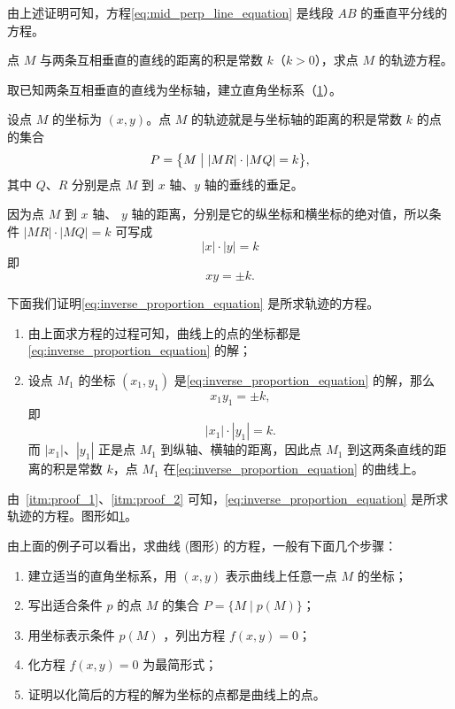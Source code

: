 由上述证明可知，方程\cref{eq:mid_perp_line_equation} 是线段 $AB$ 的垂直平分线的方程。
\begin{example}
  点 $M$ 与两条互相垂直的直线的距离的积是常数 $k$（$k>0$），求点 $M$ 的轨迹方程。
\end{example}
\begin{figure}
  \caption{}\label{fig:2-3}
\end{figure}
\begin{solution}
  取已知两条互相垂直的直线为坐标轴，建立直角坐标系（\cref{fig:2-3}）。

  设点 $M$ 的坐标为 $(x,y)$。点 $M$ 的轨迹就是与坐标轴的距离的积是常数 $k$ 的点的集合
  \[P = \bigl\{ M\bigm\vert |MR| \cdot |MQ|= k\bigr\},\]
  其中 $Q$、$R$ 分别是点 $M$ 到 $x$ 轴、$y$ 轴的垂线的垂足。

  因为点 $M$ 到 $x$ 轴、 $y$ 轴的距离，分别是它的纵坐标和横坐标的绝对值，所以条件 $\left| {MR}\right| \cdot \left| {MQ}\right| = k$ 可写成
\[|x| \cdot |y| = k\]
即
\begin{equation}
  \label{eq:inverse_proportion_equation} 
xy=\pm k.
\end{equation}
\end{solution}

下面我们证明\cref{eq:inverse_proportion_equation} 是所求轨迹的方程。
\begin{enumerate}[1 ]
  \item\label{itm:proof_1} 由上面求方程的过程可知，曲线上的点的坐标都是\cref{eq:inverse_proportion_equation} 的解；
  \item\label{itm:proof_2} 设点 $M_1$ 的坐标 $(x_1,y_1)$ 是\cref{eq:inverse_proportion_equation} 的解，那么
  \[ x_1y_1=\pm k,\]
  即
  \[ |x_1|\cdot|y_1|=k.\]
  而 $|x_1|$、$|y_1|$ 正是点 $M_1$ 到纵轴、横轴的距离，因此点 $M_1$ 到这两条直线的距离的积是常数 $k$，点 $M_1$ 在\cref{eq:inverse_proportion_equation} 的曲线上。
\end{enumerate}

由~\ref{itm:proof_1}、\ref{itm:proof_2} 可知，\cref{eq:inverse_proportion_equation} 是所求轨迹的方程。图形如\cref{fig:2-3}。

由上面的例子可以看出，求曲线 (图形) 的方程，一般有下面几个步骤：
\begin{enumerate}
  \item\label{itm:proof_step1} 建立适当的直角坐标系，用 $(x,y)$ 表示曲线上任意一点 $M$ 的坐标；
  \item\label{itm:proof_step2} 写出适合条件 $p$ 的点 $M$ 的集合 $P = \{ M \mid p(M) \}$；
  \item\label{itm:proof_step3} 用坐标表示条件 $p(M)$ ，列出方程 $f(x,y)=0$；
  \item\label{itm:proof_step4} 化方程 $f(x,y)=0$ 为最简形式；
  \item\label{itm:proof_step5} 证明以化简后的方程的解为坐标的点都是曲线上的点。
\end{enumerate}

